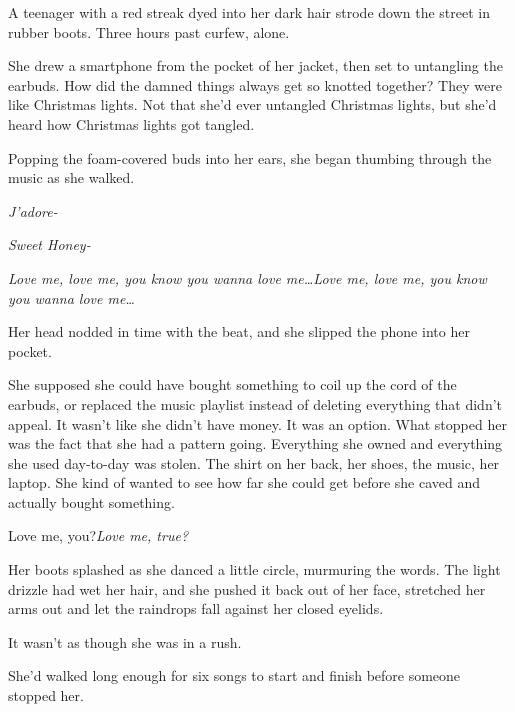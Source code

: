 





A teenager with a red streak dyed into her dark hair strode down the street in rubber boots.  Three hours past curfew, alone.



She drew a smartphone from the pocket of her jacket, then set to untangling the earbuds.  How did the damned things always get so knotted together?  They were like Christmas lights.  Not that she'd ever untangled Christmas lights, but she'd heard how Christmas lights got tangled.



Popping the foam-covered buds into her ears, she began thumbing through the music as she walked.



\emph{J'adore-}



\emph{Sweet Honey-}



\emph{Love me, love me, you know you wanna love me\ldots}\emph{Love me, love me, you know you wanna love me\ldots}



Her head nodded in time with the beat, and she slipped the phone into her pocket.



She supposed she could have bought something to coil up the cord of the earbuds, or replaced the music playlist instead of deleting everything that didn't appeal.  It wasn't like she didn't have money.  It was an option.  What stopped her was the fact that she had a pattern going.  Everything she owned and everything she used day-to-day was stolen.  The shirt on her back, her shoes, the music, her laptop.  She kind of wanted to see how far she could get before she caved and actually bought something.



Love me, you?\emph{Love me, true?}



Her boots splashed as she danced a little circle, murmuring the words.  The light drizzle had wet her hair, and she pushed it back out of her face, stretched her arms out and let the raindrops fall against her closed eyelids.



It wasn't as though she was in a rush.



She'd walked long enough for six songs to start and finish before someone stopped her.




